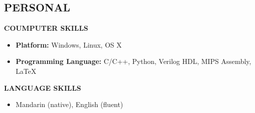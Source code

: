 \documentclass[margin,line,10pt]{res}
\begin{document}
\begin{resume}
\section{PERSONAL}
{\small \bf COUMPUTER SKILLS}
\begin{itemize}
\setlength{\itemsep}{0pt}
\setlength{\parskip}{0pt}
\setlength{\parsep}{0pt}
\item {\small \textbf{Platform:} Windows, Linux, OS X}
\item {\small \textbf{Programming Language:} C/C++, Python, Verilog HDL, MIPS Assembly, \LaTeX}
\end{itemize}
{\small \bf LANGUAGE SKILLS}
\begin{itemize}
\setlength{\itemsep}{0pt}
\setlength{\parskip}{0pt}
\setlength{\parsep}{0pt}
\item {\small Mandarin (native), English (fluent)}
\end{itemize}
\iffalse
{\small \bf EXTRA CURRICULAR}
\begin{itemize}
\setlength{\itemsep}{0pt}
\setlength{\parskip}{0pt}
\setlength{\parsep}{0pt}
\item {\small Elected {\it Machine Learning, Stanford University} in Coursera.org}
\end{itemize}
{\small \bf ACTIVITIES}
\begin{itemize}
\setlength{\itemsep}{0pt}
\setlength{\parskip}{0pt}
\setlength{\parsep}{0pt}
\item {\small College Basketball team, UM-SJTU JI, Member}
\item {\small Student Union Department of Publicity, UM-SJTU JI, Member}
\end{itemize}
\fi
\end{resume}
\end{document}
